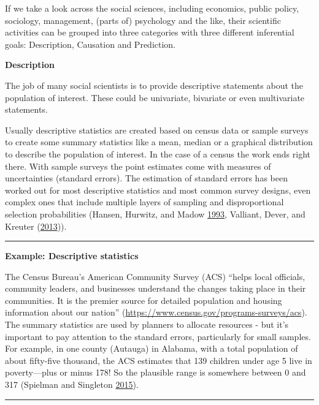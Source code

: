 \documentclass[]{krantz}
\begin{document}
If we take a look across the social sciences, including economics,
public policy, sociology, management, (parts of) psychology and the
like, their scientific activities can be grouped into three categories
with three different inferential goals: Description, Causation and
Prediction.

\textbf{Description}

The job of many social scientists is to provide descriptive statements
about the population of interest. These could be univariate, bivariate
or even multivariate statements.

Usually descriptive statistics are created based on census data or
sample surveys to create some summary statistics like a mean, median or
a graphical distribution to describe the population of interest. In the
case of a census the work ends right there. With sample surveys the
point estimates come with measures of uncertainties (standard errors).
The estimation of standard errors has been worked out for most
descriptive statistics and most common survey designs, even complex ones
that include multiple layers of sampling and disproportional selection
probabilities (Hansen, Hurwitz, and Madow
\protect\hyperlink{ref-hansen1993sample}{1993}, Valliant, Dever, and
Kreuter (\protect\hyperlink{ref-valliant2013practical}{2013})).

\begin{center}\rule{0.5\linewidth}{\linethickness}\end{center}

\textbf{Example: Descriptive statistics}

The Census Bureau's American Community Survey (ACS) ``helps local
officials, community leaders, and businesses understand the changes
taking place in their communities. It is the premier source for detailed
population and housing information about our nation''
(\url{https://www.census.gov/programs-surveys/acs}). The summary
statistics are used by planners to allocate resources - but it's
important to pay attention to the standard errors, particularly for
small samples. For example, in one county (Autauga) in Alabama, with a
total population of about fifty-five thousand, the ACS estimates that
139 children under age 5 live in poverty---plus or minus 178! So the
plausible range is somewhere between 0 and 317 (Spielman and Singleton
\protect\hyperlink{ref-Spielman2015}{2015}).

\begin{center}\rule{0.5\linewidth}{\linethickness}\end{center}
\end{document}
